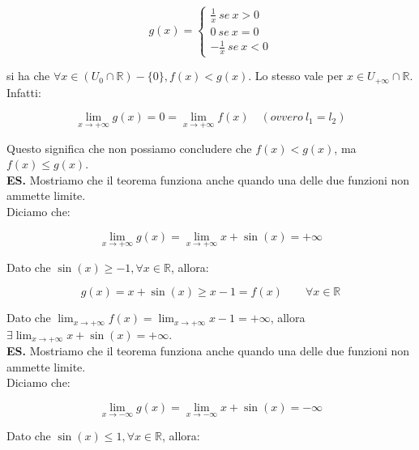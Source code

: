 \documentclass{article}
\begin{document}
\begin{equation*}
    g(x) = 
    \begin{cases}
        \frac{1}{x} \ se \ x > 0 \\
        0 \ se \ x = 0 \\
        -\frac{1}{x} \ se \ x < 0
    \end{cases}
\end{equation*}

\noindent si ha che $\forall x \in (U_0 \cap \mathbb{R}) - \{0\}, f(x) < g(x)$. Lo stesso vale per $x \in U_{+\infty} \cap \mathbb{R}$. Infatti:

\begin{equation*}
    \lim_{x \to +\infty} g(x) = 0 = \lim_{x \to +\infty} f(x) \quad (ovvero \ l_1 = l_2)
\end{equation*}

\noindent Questo significa che non possiamo concludere che $f(x) < g(x)$, ma $f(x) \leq g(x)$.\\

\noindent\textbf{ES.} Mostriamo che il teorema funziona anche quando una delle due funzioni non ammette limite.\\
Diciamo che:

\begin{equation*}
    \lim_{x \to + \infty} g(x) = \lim_{x \to + \infty} x + \sin(x) = + \infty
\end{equation*}

\noindent Dato che $\sin(x) \geq - 1, \forall x \in \mathbb{R}$, allora:

\begin{equation*}
    g(x) = x + \sin(x) \geq x - 1 = f(x) \qquad \forall x \in \mathbb{R}
\end{equation*}

\noindent Dato che $\lim_{x \to + \infty} f(x) = \lim_{x \to + \infty} x - 1 = + \infty$, allora $\exists \lim_{x \to + \infty} x + \sin(x) = + \infty$.\\

\noindent\textbf{ES.} Mostriamo che il teorema funziona anche quando una delle due funzioni non ammette limite.\\
Diciamo che:

\begin{equation*}
    \lim_{x \to - \infty} g(x) = \lim_{x \to - \infty} x + \sin(x) = - \infty
\end{equation*}

\noindent Dato che $\sin(x) \leq 1, \forall x \in \mathbb{R}$, allora:
\end{document}
